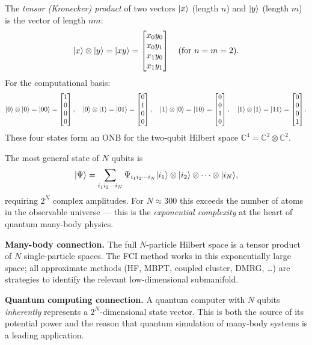 The \emph{tensor (Kronecker) product} of two vectors $\vert x \rangle$
(length $n$) and $\vert y \rangle$ (length $m$) is the vector of length $nm$:
\[
  \vert x \rangle\otimes\vert y \rangle
  =\vert xy \rangle
  =\begin{bmatrix}x_0 y_0\\ x_0 y_1\\ x_1 y_0\\ x_1 y_1\end{bmatrix}
  \quad\text{(for } n=m=2\text{)}.
\]
For the computational basis:
\[
  \vert 0 \rangle\otimes\vert 0 \rangle=\vert 00 \rangle
    =\begin{bmatrix}1\\0\\0\\0\end{bmatrix},\quad
  \vert 0 \rangle\otimes\vert 1 \rangle=\vert 01 \rangle
    =\begin{bmatrix}0\\1\\0\\0\end{bmatrix},\quad
  \vert 1 \rangle\otimes\vert 0 \rangle=\vert 10 \rangle
    =\begin{bmatrix}0\\0\\1\\0\end{bmatrix},\quad
  \vert 1 \rangle\otimes\vert 1 \rangle=\vert 11 \rangle
    =\begin{bmatrix}0\\0\\0\\1\end{bmatrix}.
\]
These four states form an ONB for the two-qubit Hilbert space
$\mathbb{C}^4=\mathbb{C}^2\otimes\mathbb{C}^2$.

The most general state of $N$ qubits is
\[
  \vert \Psi \rangle
  = \sum_{i_1 i_2\cdots i_N}\Psi_{i_1 i_2\cdots i_N}
    \vert i_1 \rangle\otimes\vert i_2 \rangle\otimes\cdots\otimes\vert i_N \rangle,
\]
requiring $2^N$ complex amplitudes.  For $N\approx 300$ this
exceeds the number of atoms in the observable universe — this is the
\emph{exponential complexity} at the heart of quantum many-body physics.

\begin{notebox}
\textbf{Many-body connection.} The full $N$-particle Hilbert space
is a tensor product of $N$ single-particle spaces.  The FCI method
works in this exponentially large space; all approximate methods
(HF, MBPT, coupled cluster, DMRG, \ldots) are strategies to identify
the relevant low-dimensional submanifold.

\textbf{Quantum computing connection.} A quantum computer with $N$
qubits \emph{inherently} represents a $2^N$-dimensional state vector.
This is both the source of its potential power and the reason that
quantum simulation of many-body systems is a leading application.
\end{notebox}

